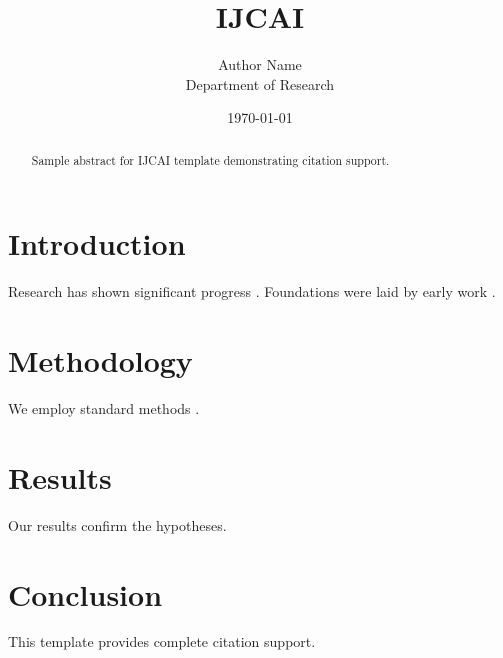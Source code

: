 \documentclass{article}
\title{IJCAI}
\author{Author Name \\ \small Department of Research}
\date{\today}
\begin{document}
\maketitle

\begin{abstract}
Sample abstract for IJCAI template demonstrating citation support.
\end{abstract}

\section{Introduction}
Research has shown significant progress \citep{einstein1905}. Foundations were laid by early work \citep{turing1950}.

\section{Methodology}
We employ standard methods \citep{knuth1984}.

\section{Results}
Our results confirm the hypotheses.

\section{Conclusion}
This template provides complete citation support.



\end{document}
